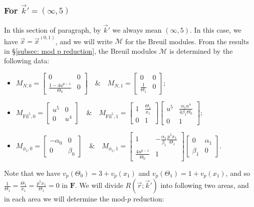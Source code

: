\documentclass[11pt]{amsart}
\theoremstyle{definition}
\numberwithin{equation}{subsection}
\theoremstyle{plain}
\theoremstyle{plain}
\theoremstyle{plain}
\theoremstyle{plain}
\theoremstyle{plain}
\theoremstyle{plain}
\theoremstyle{plain}
\theoremstyle{plain}
\theoremstyle{plain}
\theoremstyle{plain}
\theoremstyle{plain}
\theoremstyle{plain}
\theoremstyle{definition}
\theoremstyle{definition}
\theoremstyle{definition}
\theoremstyle{remark}
\renewcommand{\(}{\textup{(}}
\renewcommand{\)}{\textup{)}}
\newcommand{\F}{\mathbf{F}}
\newcommand{\cM}{\mathcal{M}}
\newcommand{\Fil}{\mathrm{Fil}}
\newcommand{\vx}{\vec{x}}
\newcommand{\vr}{\vec{r}}
\newcommand{\vk}{\vec{k}}
\begin{document}
\subsubsection{\textbf{For $\vk'=(\infty,5)$}}\label{subsubsec: vr=(1,5), vk=(infty,5)}
In this section of paragraph, by $\vk'$ we always mean $(\infty,5)$. In this case, we have $\vx=\vx^{(0,1)}$, and we will write $\cM$ for the Breuil modules. From the results in \S\ref{subsec: mod p reduction}, the Breuil modules $\cM$ is determined by the following data:
\begin{itemize}[leftmargin=*]
  \item $M_{N,0}=
  \begin{bmatrix}
    0 & 0 \\
    \frac{1-4u^{p-1}}{\Theta_0} & 0
  \end{bmatrix}\quad\&\quad
  M_{N,1}=
  \begin{bmatrix}
    0 & 0 \\
    \frac{1}{\Theta_1} & 0
  \end{bmatrix}$;
  \item $M_{\Fil^5,0}=
  \begin{bmatrix}
    u^5 & 0 \\
    0 & u^4
  \end{bmatrix}\quad\&\quad
  M_{\Fil^5,1}=
  \begin{bmatrix}
    1 & \frac{\Theta_1}{x_1} \\
    0 & 1
  \end{bmatrix}
  \begin{bmatrix}
    u^5 & \frac{\alpha_1u^4}{4\beta_1\Theta_0} \\
    0 & 1
  \end{bmatrix}$;
  \item $M_{\phi_5,0}=
  \begin{bmatrix}
    -\alpha_0 & 0\\
    0 & \beta_0
  \end{bmatrix}\quad\&\quad
  M_{\phi_5,1}=
  \begin{bmatrix}
    1 & -\frac{\alpha_1}{\beta_1}\frac{p^5x_1}{\Theta_1} \\
    \frac{4u^{p-1}}{\Theta_0} & 1
  \end{bmatrix}
  \begin{bmatrix}
    0 & \alpha_1 \\
    \beta_1 & 0
  \end{bmatrix}$.
\end{itemize}
Note that we have $v_p(\Theta_0)=3+v_p(x_1)$ and $v_p(\Theta_1)=1+v_p(x_1)$, and so $\frac{1}{\Theta_1}=\frac{\Theta_1}{x_1}=\frac{p^5x_1}{\Theta_1}=0$ in $\F$. We will divide $R(\vr;\vk')$ into following two areas, and in each area we will determine the mod-$p$ reduction:
\end{document}
